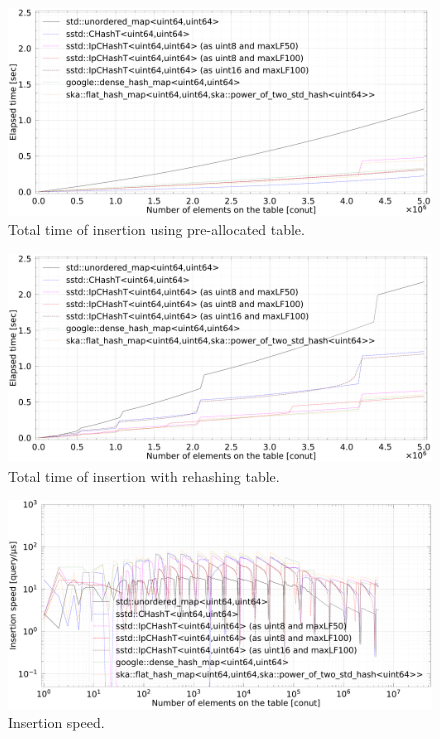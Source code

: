 \begin{figure}[h]
  \includegraphics[scale=0.24]{./fig_bench/insert_et_preAlloc_med.pdf}
  \caption{ Total time of insertion using pre-allocated table. }
  \label{fig_bench_insert_preAlloc}
\end{figure}

\begin{figure}[h]
  \includegraphics[scale=0.24]{./fig_bench/insert_et_med.pdf}
  \caption{ Total time of insertion with rehashing table. }
  \label{fig_bench_insert_wRehash}
\end{figure}

\begin{figure}[h]
  \hspace{-3mm}
  \includegraphics[scale=0.24]{./fig_bench/insert_med.pdf}
  \caption{ Insertion speed. }
  \label{fig_bench_insert}
\end{figure}

